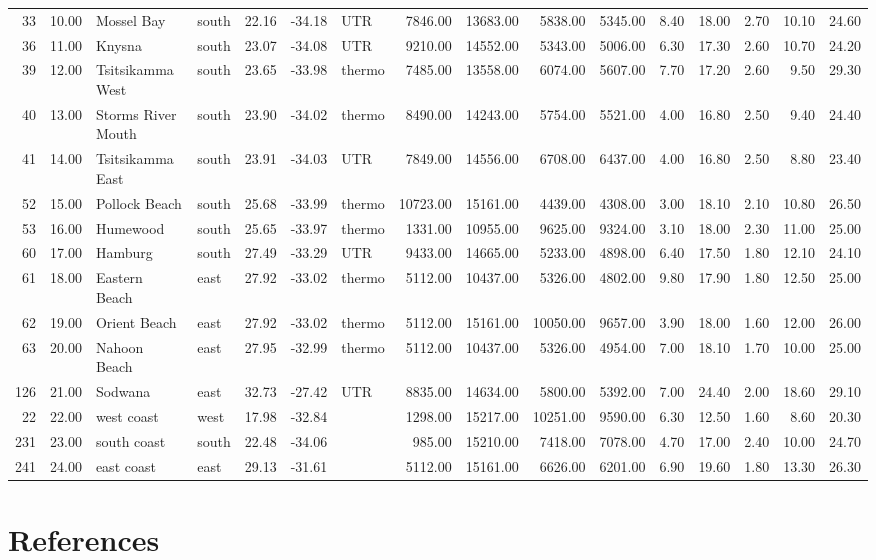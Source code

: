 \documentclass[a4paper,10pt,review]{elsarticle}
\begin{document}
\begin{table}[]
\begin{tabular}{rrllrrlrrrrrrrrr}
  33 & 10.00 & Mossel Bay & south & 22.16 & -34.18 & UTR & 7846.00 & 13683.00 & 5838.00 & 5345.00 & 8.40 & 18.00 & 2.70 & 10.10 & 24.60 \\ 
  36 & 11.00 & Knysna & south & 23.07 & -34.08 & UTR & 9210.00 & 14552.00 & 5343.00 & 5006.00 & 6.30 & 17.30 & 2.60 & 10.70 & 24.20 \\ 
  39 & 12.00 & Tsitsikamma West & south & 23.65 & -33.98 & thermo & 7485.00 & 13558.00 & 6074.00 & 5607.00 & 7.70 & 17.20 & 2.60 & 9.50 & 29.30 \\ 
  40 & 13.00 & Storms River Mouth & south & 23.90 & -34.02 & thermo & 8490.00 & 14243.00 & 5754.00 & 5521.00 & 4.00 & 16.80 & 2.50 & 9.40 & 24.40 \\ 
  41 & 14.00 & Tsitsikamma East & south & 23.91 & -34.03 & UTR & 7849.00 & 14556.00 & 6708.00 & 6437.00 & 4.00 & 16.80 & 2.50 & 8.80 & 23.40 \\ 
  52 & 15.00 & Pollock Beach & south & 25.68 & -33.99 & thermo & 10723.00 & 15161.00 & 4439.00 & 4308.00 & 3.00 & 18.10 & 2.10 & 10.80 & 26.50 \\ 
  53 & 16.00 & Humewood & south & 25.65 & -33.97 & thermo & 1331.00 & 10955.00 & 9625.00 & 9324.00 & 3.10 & 18.00 & 2.30 & 11.00 & 25.00 \\ 
  60 & 17.00 & Hamburg & south & 27.49 & -33.29 & UTR & 9433.00 & 14665.00 & 5233.00 & 4898.00 & 6.40 & 17.50 & 1.80 & 12.10 & 24.10 \\ 
  61 & 18.00 & Eastern Beach & east & 27.92 & -33.02 & thermo & 5112.00 & 10437.00 & 5326.00 & 4802.00 & 9.80 & 17.90 & 1.80 & 12.50 & 25.00 \\ 
  62 & 19.00 & Orient Beach & east & 27.92 & -33.02 & thermo & 5112.00 & 15161.00 & 10050.00 & 9657.00 & 3.90 & 18.00 & 1.60 & 12.00 & 26.00 \\ 
  63 & 20.00 & Nahoon Beach & east & 27.95 & -32.99 & thermo & 5112.00 & 10437.00 & 5326.00 & 4954.00 & 7.00 & 18.10 & 1.70 & 10.00 & 25.00 \\ 
  126 & 21.00 & Sodwana & east & 32.73 & -27.42 & UTR & 8835.00 & 14634.00 & 5800.00 & 5392.00 & 7.00 & 24.40 & 2.00 & 18.60 & 29.10 \\ 
  22 & 22.00 & west coast & west & 17.98 & -32.84 &  & 1298.00 & 15217.00 & 10251.00 & 9590.00 & 6.30 & 12.50 & 1.60 & 8.60 & 20.30 \\ 
  231 & 23.00 & south coast & south & 22.48 & -34.06 &  & 985.00 & 15210.00 & 7418.00 & 7078.00 & 4.70 & 17.00 & 2.40 & 10.00 & 24.70 \\ 
  241 & 24.00 & east coast & east & 29.13 & -31.61 &  & 5112.00 & 15161.00 & 6626.00 & 6201.00 & 6.90 & 19.60 & 1.80 & 13.30 & 26.30 \\ 
  \hline
  \end{tabular}
\end{table}

\section*{References}


\end{document}
